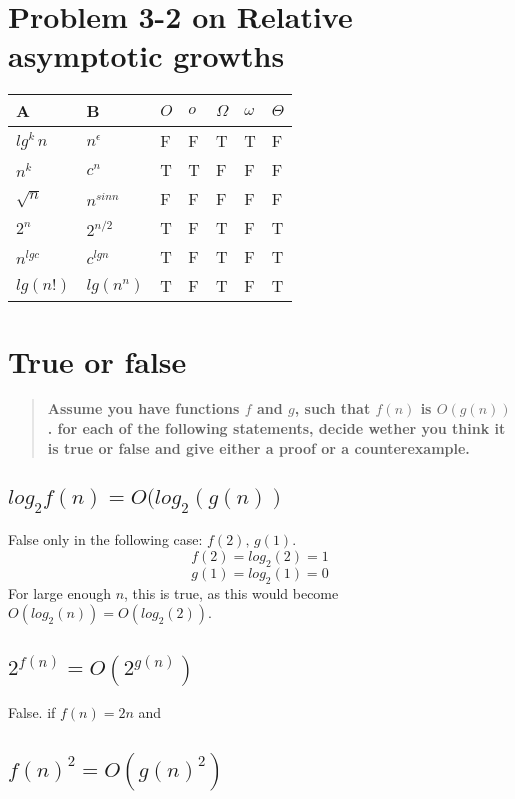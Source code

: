 \documentclass[titlepage]{article}\usepackage[]{graphicx}\usepackage[]{color}
\begin{document}
\section{ Problem 3-2 on Relative asymptotic growths}
\begin{table}[h]
  \begin{tabular}{ll|l|l|l|l|l}
	A & B  & $O$  & $o$  & $\Omega$  & $\omega$  & $\Theta$  \\ \hline	
	$lg^k\,n$ &  $n^\epsilon$   & F  & F  & T   &T  &F  \\ \hline	
	$n^k$     & $c^n$  & T & T  &F  &F  &F  \\ \hline	
	$\sqrt{n}$ & $n^{sin n}$  & F  &  F &  F &  F &  F \\ \hline	
	$2^n$  & $2^{n/2}$   & T &F  & T  & F  & T  \\ \hline	
	$n^{lg c}$ & $c^{lg n}$ & T  & F & T  & F  & T  \\ \hline	
	$lg(n!)$ & $lg(n^n)$ &T   & F  &T  &F  & T  
  \end{tabular}
\end{table}


\section{ True or false }
\begin{quote}
	\bf{Assume you have functions $f$ and $g$, such that $f(n)$ is $O(g(n))$.
  for each of the following statements, decide wether you think it is true or false and give
either a proof or a counterexample. }
\end{quote}

\subsection{ $log_2f(n) = O(log_2(g(n))$}
False only in the following case: $f(2),\, g(1)$.
\[ f(2) = log_2(2) = 1 \]
\[ g(1) = log_2(1) = 0 \]
For large enough $n$, this is true, as this would become $O(log_2(n)) =
O(log_2(2))$. 

\subsection{ $2^{ f(n) } = O(2^{ g(n) })$}
False.
if $f(n) = 2n$ and 


\subsection{$  f(n)^2 = O(g(n)^2)$}
\end{document}
